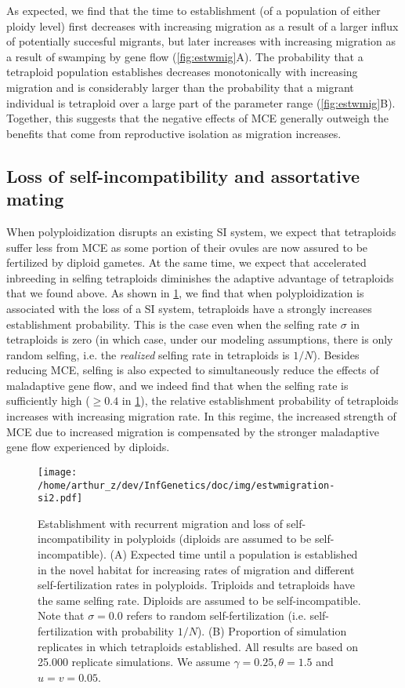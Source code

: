 \documentclass[12pt,a4paper]{article}
\begin{document}
As expected, we find that the time to establishment (of a population of either
ploidy level) first decreases with increasing migration as a result of a larger
influx of potentially succesful migrants, but later increases with increasing
migration as a result of swamping by gene flow (\cref{fig:estwmig}A).
The probability that a tetraploid population establishes decreases
monotonically with increasing migration and is considerably larger than the
probability that a migrant individual is tetraploid over a large part of the
parameter range (\cref{fig:estwmig}B).
Together, this suggests that the negative effects of MCE generally outweigh the
benefits that come from reproductive isolation as migration increases.

\subsection*{Loss of self-incompatibility and assortative mating}

When polyploidization disrupts an existing SI system, we expect that
tetraploids suffer less from MCE as some portion of their ovules are now
assured to be fertilized by diploid gametes.
At the same time, we expect that accelerated inbreeding in selfing tetraploids
diminishes the adaptive advantage of tetraploids that we found above.
As shown in \cref{fig:selfing}, we find that when polyploidization is
associated with the loss of a SI system, tetraploids have a strongly increases
establishment probability.
This is the case even when the selfing rate $\sigma$ in tetraploids is zero (in
which case, under our modeling assumptions, there is only random selfing, i.e.
the \textit{realized} selfing rate in tetraploids is $1/N$).
Besides reducing MCE, selfing is also expected to simultaneously reduce the
effects of maladaptive gene flow, and we indeed find that when the selfing rate
is sufficiently high ($\ge 0.4$ in \cref{fig:selfing}), the relative
establishment probability of tetraploids increases with increasing migration
rate.
In this regime, the increased strength of MCE due to increased migration is
compensated by the stronger maladaptive gene flow experienced by diploids.

\begin{figure}
\centering
\texttt{[image: /home/arthur\_z/dev/InfGenetics/doc/img/estwmigration-si2.pdf]}
\caption{
Establishment with recurrent migration and loss of self-incompatibility in
polyploids (diploids are assumed to be self-incompatible).
(A) Expected time until a population is established in the novel habitat for
increasing rates of migration and different self-fertilization rates in
polyploids. Triploids and tetraploids have the same selfing rate. 
Diploids are assumed to be self-incompatible.  Note that $\sigma=0.0$ refers to
random self-fertilization (i.e.  self-fertilization with probability $1/N$). 
(B) Proportion of simulation replicates in which tetraploids established. 
All results are based on 25.000 replicate simulations.
We assume $\gamma=0.25, \theta=1.5$ and $u=v=0.05$.
\label{fig:selfing}}
\end{figure}
\end{document}
